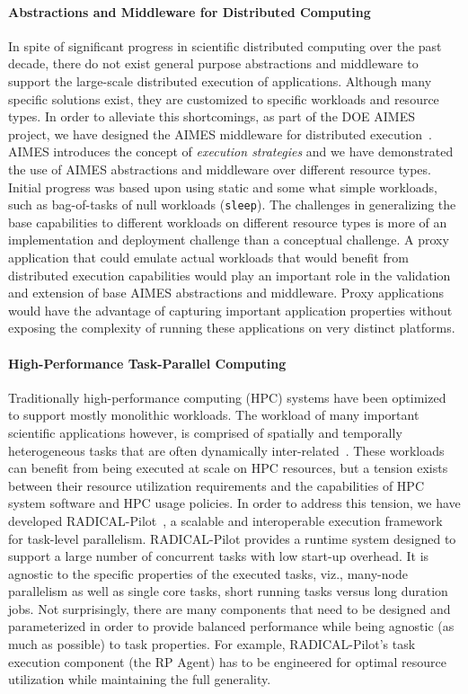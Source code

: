 \documentclass[10pt, conference, compsocconf]{IEEEtran}
\newcommand{\rp}{RADICAL-Pilot\xspace}
\begin{document}
\paragraph{Abstractions and Middleware for Distributed Computing} 
In spite of significant progress in scientific distributed computing over the
past decade, there do not exist general purpose abstractions and middleware to
support the large-scale distributed execution of applications. Although many
specific solutions exist, they are customized to specific workloads and resource
types. In order to alleviate this shortcomings, as part of the DOE AIMES
project, we have designed the AIMES middleware for distributed
execution~\cite{ipdps-2016}. AIMES introduces the concept of {\it execution
  strategies} and we have demonstrated the use of AIMES abstractions and
middleware over different resource types. Initial progress was based upon using
static and some what simple workloads, such as bag-of-tasks of null workloads
(\texttt{sleep}). The challenges in generalizing the base capabilities to
different workloads on different resource types is more of an implementation and
deployment challenge than a conceptual challenge.  A proxy application that
could emulate actual workloads that would benefit from distributed execution
capabilities would play an important role in the validation and extension of
base AIMES abstractions and middleware. Proxy applications would have the
advantage of capturing important application properties without exposing the
complexity of running these applications on very distinct platforms.  



\paragraph{High-Performance Task-Parallel Computing} 
Traditionally high-performance computing (HPC) systems have been optimized to
support mostly monolithic workloads.  The workload of many important scientific
applications however, is comprised of spatially and temporally heterogeneous
tasks that are often dynamically inter-related~\cite{note4}. These workloads can
benefit from being executed at scale on HPC resources, but a tension exists
between their resource utilization requirements and the capabilities of HPC
system software and HPC usage policies.  In order to address this tension, we
have developed RADICAL-Pilot~\cite{review_radicalpilot_2015}, a scalable and
interoperable execution framework for task-level parallelism. \rp provides a
runtime system designed to support a large number of concurrent tasks with low
start-up overhead. It is agnostic to the specific properties of the executed
tasks, viz., many-node parallelism as well as single core tasks, short running
tasks versus long duration jobs.  Not surprisingly, there are many components
that need to be designed and parameterized in order to provide balanced
performance while being agnostic (as much as possible) to task properties. For
example, \rp's task execution component (the RP Agent) has to be engineered for
optimal resource utilization while maintaining the full generality.  
\end{document}
